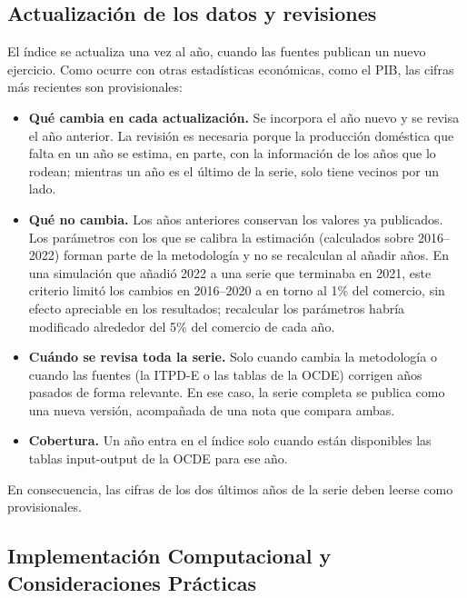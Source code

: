\documentclass[final,1p,times,authoryear]{elsarticle}
\begin{document}
\subsection{Actualización de los datos y revisiones}\label{subsec:revisiones}
El índice se actualiza una vez al año, cuando las fuentes publican un nuevo ejercicio. Como ocurre con otras estadísticas económicas, como el PIB, las cifras más recientes son provisionales:
\begin{itemize}
    \item \textbf{Qué cambia en cada actualización.} Se incorpora el año nuevo y se revisa el año anterior. La revisión es necesaria porque la producción doméstica que falta en un año se estima, en parte, con la información de los años que lo rodean; mientras un año es el último de la serie, solo tiene vecinos por un lado.
    \item \textbf{Qué no cambia.} Los años anteriores conservan los valores ya publicados. Los parámetros con los que se calibra la estimación (calculados sobre 2016--2022) forman parte de la metodología y no se recalculan al añadir años. En una simulación que añadió 2022 a una serie que terminaba en 2021, este criterio limitó los cambios en 2016--2020 a en torno al 1\% del comercio, sin efecto apreciable en los resultados; recalcular los parámetros habría modificado alrededor del 5\% del comercio de cada año.
    \item \textbf{Cuándo se revisa toda la serie.} Solo cuando cambia la metodología o cuando las fuentes (la ITPD-E o las tablas de la OCDE) corrigen años pasados de forma relevante. En ese caso, la serie completa se publica como una nueva versión, acompañada de una nota que compara ambas.
    \item \textbf{Cobertura.} Un año entra en el índice solo cuando están disponibles las tablas input-output de la OCDE para ese año.
\end{itemize}
En consecuencia, las cifras de los dos últimos años de la serie deben leerse como provisionales.

\subsection{Implementación Computacional y Consideraciones Prácticas}
\end{document}
